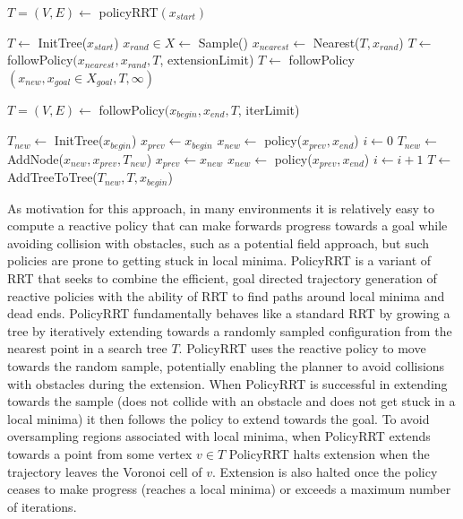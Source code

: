 \documentclass[../thesis.tex]{subfiles}
\begin{document}
\begin{algorithm}
\caption{$T=(V,E) \leftarrow$ policyRRT$(x_{start})$}\label{euclid}
\begin{algorithmic}[1]
\State $T \leftarrow$ InitTree($x_{start}$)
\State $x_{rand} \in X \leftarrow$ Sample()
\State $x_{nearest} \leftarrow $ Nearest($T, x_{rand}$)
\State $T \leftarrow $ followPolicy$(x_{nearest}, x_{rand}, T$, extensionLimit)
\State $T \leftarrow $ followPolicy$(x_{new}, x_{goal} \in X_{goal}, T, \infty)$
\EndIf
\EndWhile
\end{algorithmic}
\end{algorithm}

\begin{algorithm}
\caption{$T=(V,E) \leftarrow$ followPolicy$(x_{begin}, x_{end}, T$, iterLimit)}\label{euclid}
\begin{algorithmic}[1]
\State $T_{new} \leftarrow $ InitTree($x_{begin}$)
\State $x_{prev} \leftarrow x_{begin}$
\State $x_{new} \leftarrow $ policy($x_{prev}, x_{end}$)
\State $i \leftarrow 0$
\State $T_{new} \leftarrow $ AddNode($x_{new}, x_{prev}, T_{new}$)
\State $x_{prev} \leftarrow x_{new}$ 
\State $x_{new} \leftarrow $ policy($x_{prev}, x_{end}$)
\State $i \leftarrow i+1$
\EndWhile
\State $T \leftarrow $ AddTreeToTree($T_{new}, T, x_{begin}$)
\end{algorithmic}
\end{algorithm}

As motivation for this approach, in many environments it is relatively easy to compute a reactive policy that can make forwards progress towards a goal while avoiding collision with obstacles, such as a potential field approach, but such policies are prone to getting stuck in local minima.
PolicyRRT is a variant of RRT that seeks to combine the efficient, goal directed trajectory generation of reactive policies with the ability of RRT to find paths around local minima and dead ends.
PolicyRRT fundamentally behaves like a standard RRT by growing a tree by iteratively extending towards a randomly sampled configuration from the nearest point in a search tree $T$.
PolicyRRT uses the reactive policy to move towards the random sample, potentially enabling the planner to avoid collisions with obstacles during the extension.
When PolicyRRT is successful in extending towards the sample (does not collide with an obstacle and does not get stuck in a local minima) it then follows the policy to extend towards the goal.
To avoid oversampling regions associated with local minima, when PolicyRRT extends towards a point from some vertex $v \in T$ PolicyRRT halts extension when the trajectory leaves the Voronoi cell of $v$.
Extension is also halted once the policy ceases to make progress (reaches a local minima) or exceeds a maximum number of iterations.
\end{document}
